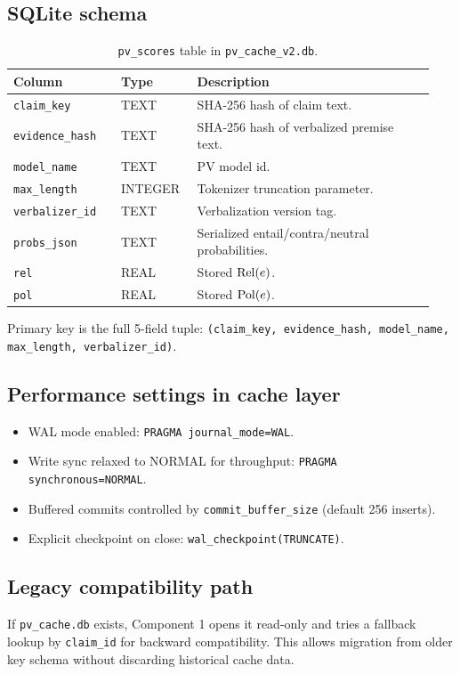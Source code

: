 \subsection{SQLite schema}
\begin{table}[H]
\centering
\begin{tabular}{@{}p{0.24\linewidth}p{0.17\linewidth}p{0.53\linewidth}@{}}
\toprule
Column & Type & Description \\
\midrule
\texttt{claim\_key} & TEXT & SHA-256 hash of claim text. \\
\texttt{evidence\_hash} & TEXT & SHA-256 hash of verbalized premise text. \\
\texttt{model\_name} & TEXT & PV model id. \\
\texttt{max\_length} & INTEGER & Tokenizer truncation parameter. \\
\texttt{verbalizer\_id} & TEXT & Verbalization version tag. \\
\texttt{probs\_json} & TEXT & Serialized entail/contra/neutral probabilities. \\
\texttt{rel} & REAL & Stored $\operatorname{Rel}(e)$. \\
\texttt{pol} & REAL & Stored $\operatorname{Pol}(e)$. \\
\bottomrule
\end{tabular}
\caption{\texttt{pv\_scores} table in \texttt{pv\_cache\_v2.db}.}
\label{tab:c1_cache_schema}
\end{table}

Primary key is the full 5-field tuple:
\texttt{(claim\_key, evidence\_hash, model\_name, max\_length, verbalizer\_id)}.

\subsection{Performance settings in cache layer}
\begin{itemize}
\item WAL mode enabled: \texttt{PRAGMA journal\_mode=WAL}.
\item Write sync relaxed to NORMAL for throughput: \texttt{PRAGMA synchronous=NORMAL}.
\item Buffered commits controlled by \texttt{commit\_buffer\_size} (default 256 inserts).
\item Explicit checkpoint on close: \texttt{wal\_checkpoint(TRUNCATE)}.
\end{itemize}

\subsection{Legacy compatibility path}
If \texttt{pv\_cache.db} exists, Component 1 opens it read-only and tries a fallback lookup
by \texttt{claim\_id} for backward compatibility.
This allows migration from older key schema without discarding historical cache data.

